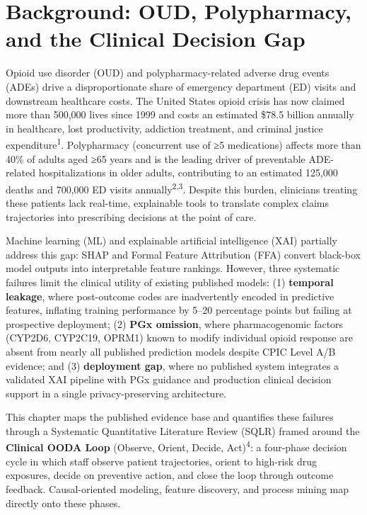 \documentclass[
  12pt,
]{book}
\begin{document}
\section{Background: OUD, Polypharmacy, and the Clinical Decision
Gap}\label{background-oud-polypharmacy-and-the-clinical-decision-gap}

Opioid use disorder (OUD) and polypharmacy-related adverse drug events
(ADEs) drive a disproportionate share of emergency department (ED)
visits and downstream healthcare costs. The United States opioid crisis
has now claimed more than 500,000 lives since 1999 and costs an
estimated \$78.5 billion annually in healthcare, lost productivity,
addiction treatment, and criminal justice
expenditure\textsuperscript{1}. Polypharmacy (concurrent use of ≥5
medications) affects more than 40\% of adults aged ≥65 years and is the
leading driver of preventable ADE-related hospitalizations in older
adults, contributing to an estimated 125,000 deaths and 700,000 ED
visits annually\textsuperscript{2,3}. Despite this burden, clinicians
treating these patients lack real-time, explainable tools to translate
complex claims trajectories into prescribing decisions at the point of
care.

Machine learning (ML) and explainable artificial intelligence (XAI)
partially address this gap: SHAP and Formal Feature Attribution (FFA)
convert black-box model outputs into interpretable feature rankings.
However, three systematic failures limit the clinical utility of
existing published models: (1) \textbf{temporal leakage}, where
post-outcome codes are inadvertently encoded in predictive features,
inflating training performance by 5--20 percentage points but failing at
prospective deployment; (2) \textbf{PGx omission}, where pharmacogenomic
factors (CYP2D6, CYP2C19, OPRM1) known to modify individual opioid
response are absent from nearly all published prediction models despite
CPIC Level A/B evidence; and (3) \textbf{deployment gap}, where no
published system integrates a validated XAI pipeline with PGx guidance
and production clinical decision support in a single privacy-preserving
architecture.

This chapter maps the published evidence base and quantifies these
failures through a Systematic Quantitative Literature Review (SQLR)
framed around the \textbf{Clinical OODA Loop} (Observe, Orient, Decide,
Act)\textsuperscript{4}: a four-phase decision cycle in which staff
observe patient trajectories, orient to high-risk drug exposures, decide
on preventive action, and close the loop through outcome feedback.
Causal-oriented modeling, feature discovery, and process mining map
directly onto these phases.
\end{document}

